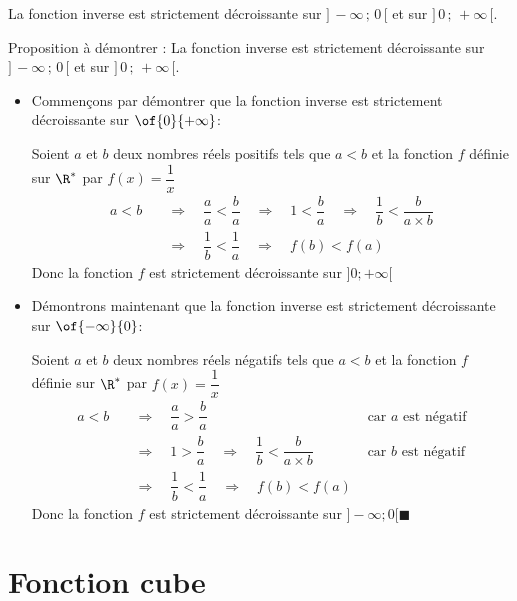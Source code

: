 \begin{prop}{}{}
La fonction inverse est strictement décroissante sur $] \, -\infty \, ; \, 0 \, [$ et sur $] \, 0 \, ; \, +\infty \, [$.
\end{prop}

\begin{deme}{}{}
Proposition à démontrer : \og La fonction inverse est strictement décroissante sur $] \, -\infty \, ; \, 0 \, [$ et sur $] \, 0 \, ; \, +\infty \, [$. \fg{} 

\medskip
\begin{itemize}
\item Commençons par démontrer que la fonction inverse est strictement décroissante sur $\of{0}{+\infty}$:

Soient $a$ et $b$ deux nombres réels positifs tels que $a<b$ et la fonction $f$ définie sur $\R^*$ par $f(x)=\dfrac{1}{x}$
\begin{align*}
a<b \quad &\Longrightarrow \quad \dfrac{a}{a} < \dfrac{b}{a} \quad \Longrightarrow \quad 1 < \dfrac{b}{a} \quad \Longrightarrow \quad \dfrac{1}{b} < \dfrac{b}{a\times b}\\
&\Longrightarrow \quad \dfrac{1}{b} < \dfrac{1}{a}\quad \Longrightarrow \quad f(b) < f(a)
\end{align*} 
Donc la fonction $f$ est strictement décroissante sur $]0;+\infty[$
\item Démontrons maintenant que la fonction inverse est strictement décroissante sur $\of{-\infty}{0}$:

Soient $a$ et $b$ deux nombres réels négatifs tels que $a<b$ et la fonction $f$ définie sur $\R^*$ par $f(x)=\dfrac{1}{x}$
\begin{align*}
a<b \quad &\Longrightarrow \quad \dfrac{a}{a} > \dfrac{b}{a} & \text{ car } a \text{ est négatif}\\
&\Longrightarrow \quad 1 > \dfrac{b}{a} \quad \Longrightarrow \quad \dfrac{1}{b} < \dfrac{b}{a\times b}& \text{ car } b \text{ est négatif}\\
&\Longrightarrow \quad \dfrac{1}{b} < \dfrac{1}{a} \quad \Longrightarrow \quad f(b) < f(a)
\end{align*} 
Donc la fonction $f$ est strictement décroissante sur $]-\infty;0[$\hfill$\blacksquare$
\end{itemize}
\end{deme}

\vspace{-5mm}
\section{Fonction cube}

